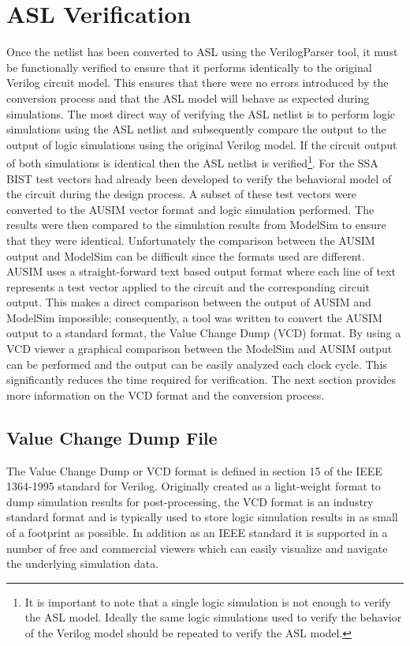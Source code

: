 \documentclass[12pt]{report}
\begin{document}
\section{ASL Verification}
Once the netlist has been converted to ASL using the VerilogParser tool, it must be functionally verified to ensure that it performs identically to the original Verilog circuit model.  This ensures that there were no errors introduced by the conversion process and that the ASL model will behave as expected during simulations.  The most direct way of verifying the ASL netlist is to perform logic simulations using the ASL netlist and subsequently compare the output to the output of logic simulations using the original Verilog model.  If the circuit output of both simulations is identical then the ASL netlist is verified\footnote{It is important to note that a single logic simulation is not enough to verify the ASL model.  Ideally the same logic simulations used to verify the behavior of the Verilog model should be repeated to verify the ASL model.}.  For the SSA BIST test vectors had already been developed to verify the behavioral model of the circuit during the design process.  A subset of these test vectors were converted to the AUSIM vector format and logic simulation performed.  The results were then compared to the simulation results from ModelSim to ensure that they were identical.  Unfortunately the comparison between the AUSIM output and ModelSim can be difficult since the formats used are different.  AUSIM uses a straight-forward text based output format where each line of text represents a test vector applied to the circuit and the corresponding circuit output.  This makes a direct comparison between the output of AUSIM and ModelSim impossible; consequently, a tool was written to convert the AUSIM output to a standard format, the Value Change Dump (VCD) format.  By using a VCD viewer a graphical comparison between the ModelSim and AUSIM output can be performed and the output can be easily analyzed each clock cycle.  This significantly reduces the time required for verification.  The next section provides more information on the VCD format and the conversion process.

\subsection{Value Change Dump File}
The Value Change Dump or VCD format is defined in section 15 of the IEEE 1364-1995 standard for Verilog\cite{verilog}.  Originally created as a light-weight format to dump simulation results for post-processing\cite{verilog}, the VCD format is an industry standard format and is typically used to store logic simulation results in as small of a footprint as possible\cite{verilog}.  In addition as an IEEE standard it is supported in a number of free and commercial viewers which can easily visualize and navigate the underlying simulation data. 
\end{document}
